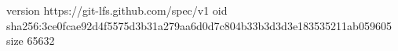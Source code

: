 version https://git-lfs.github.com/spec/v1
oid sha256:3ce0fcae92d4f5575d3b31a279aa6d0d7c804b33b3d3d3e183535211ab059605
size 65632
